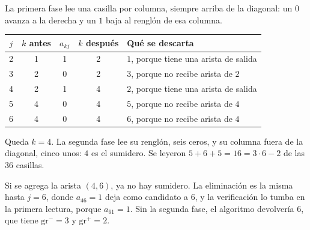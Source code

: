 \documentclass[11pt,letterpaper]{article}
\begin{document}
\begin{ejemplo}
\begin{center}
  \end{center}
  La primera fase lee una casilla por columna, siempre arriba de la
  diagonal: un $0$ avanza a la derecha y un $1$ baja al renglón de esa
  columna.
  \begin{center}
  \small
  \begin{tabular}{ccccl}
    \toprule
    $j$ & $k$ antes & $a_{kj}$ & $k$ después
      & \textbf{Qué se descarta} \\
    \midrule
    2 & 1 & 1 & 2 & $1$, porque tiene una arista de salida \\
    3 & 2 & 0 & 2 & $3$, porque no recibe arista de $2$ \\
    4 & 2 & 1 & 4 & $2$, porque tiene una arista de salida \\
    5 & 4 & 0 & 4 & $5$, porque no recibe arista de $4$ \\
    6 & 4 & 0 & 4 & $6$, porque no recibe arista de $4$ \\
    \bottomrule
  \end{tabular}
  \end{center}
  Queda $k = 4$. La segunda fase lee su renglón, seis ceros, y su
  columna fuera de la diagonal, cinco unos: $4$ es el sumidero. Se
  leyeron $5 + 6 + 5 = 16 = 3 \cdot 6 - 2$ de las $36$ casillas.

  Si se agrega la arista $(4, 6)$, ya no hay sumidero. La eliminación
  es la misma hasta $j = 6$, donde $a_{46} = 1$ deja como candidato a
  $6$, y la verificación lo tumba en la primera lectura, porque
  $a_{61} = 1$. Sin la segunda fase, el algoritmo devolvería $6$, que
  tiene $\text{gr}^{-} = 3$ y $\text{gr}^{+} = 2$.
\end{ejemplo}
\end{document}
